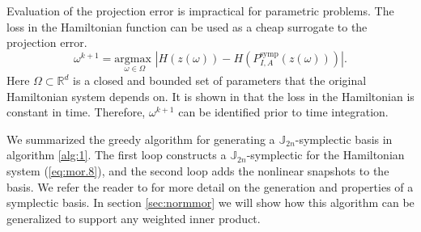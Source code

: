 Evaluation of the projection error is impractical for parametric problems. The loss in the Hamiltonian function can be used as a cheap surrogate to the projection error.
\begin{equation} \label{eq:mor.16}
	\omega^{k+1} = \underset{\omega \in \Omega}{\text{argmax } } | H(z(\omega)) - H(P^\text{symp}_{I,A}(z(\omega))) |.
\end{equation}
Here $\Omega\subset \mathbb R^{d}$ is a closed and bounded set of parameters that the original Hamiltonian system depends on. It is shown in \cite{doi:10.1137/17M1111991} that the loss in the Hamiltonian is constant in time. Therefore, $\omega^{k+1}$ can be identified prior to time integration.

We summarized the greedy algorithm for generating a $\mathbb J_{2n}$-symplectic basis in algorithm \ref{alg:1}. The first loop constructs a $\mathbb J_{2n}$-symplectic for the Hamiltonian system (\ref{eq:mor.8}), and the second loop adds the nonlinear snapshots to  the basis. We refer the reader to \cite{doi:10.1137/17M1111991} for more detail on the generation and properties of a symplectic basis. In section \ref{sec:normmor} we will show how this algorithm can be generalized to support any weighted inner product.

